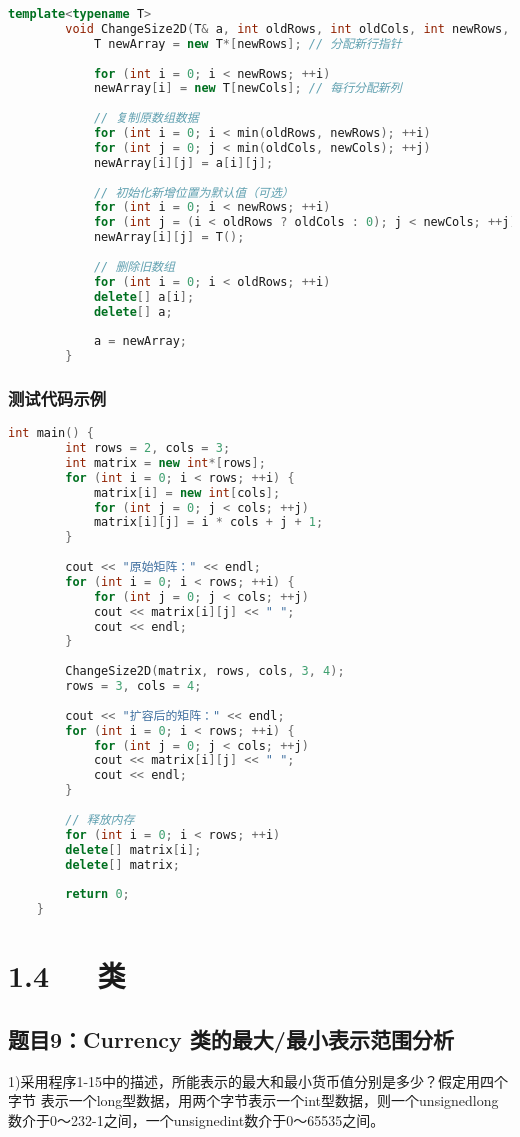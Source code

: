 \documentclass[UTF8]{ctexart}
\begin{document}
	\begin{lstlisting}[language=C++]
		template<typename T>
		void ChangeSize2D(T& a, int oldRows, int oldCols, int newRows, int newCols) {
			T newArray = new T*[newRows]; // 分配新行指针
			
			for (int i = 0; i < newRows; ++i)
			newArray[i] = new T[newCols]; // 每行分配新列
			
			// 复制原数组数据
			for (int i = 0; i < min(oldRows, newRows); ++i)
			for (int j = 0; j < min(oldCols, newCols); ++j)
			newArray[i][j] = a[i][j];
			
			// 初始化新增位置为默认值（可选）
			for (int i = 0; i < newRows; ++i)
			for (int j = (i < oldRows ? oldCols : 0); j < newCols; ++j)
			newArray[i][j] = T();
			
			// 删除旧数组
			for (int i = 0; i < oldRows; ++i)
			delete[] a[i];
			delete[] a;
			
			a = newArray;
		}
	\end{lstlisting}
	
	\subsubsection{测试代码示例}
	\begin{lstlisting}[language=C++]
	int main() {
		int rows = 2, cols = 3;
		int matrix = new int*[rows];
		for (int i = 0; i < rows; ++i) {
			matrix[i] = new int[cols];
			for (int j = 0; j < cols; ++j)
			matrix[i][j] = i * cols + j + 1;
		}
		
		cout << "原始矩阵：" << endl;
		for (int i = 0; i < rows; ++i) {
			for (int j = 0; j < cols; ++j)
			cout << matrix[i][j] << " ";
			cout << endl;
		}
		
		ChangeSize2D(matrix, rows, cols, 3, 4);
		rows = 3, cols = 4;
		
		cout << "扩容后的矩阵：" << endl;
		for (int i = 0; i < rows; ++i) {
			for (int j = 0; j < cols; ++j)
			cout << matrix[i][j] << " ";
			cout << endl;
		}
		
		// 释放内存
		for (int i = 0; i < rows; ++i)
		delete[] matrix[i];
		delete[] matrix;
		
		return 0;
	}
\end{lstlisting}
	\section{1.4~~~类}
	\subsection{题目9：Currency 类的最大/最小表示范围分析}
	1)采用程序1-15中的描述，所能表示的最大和最小货币值分别是多少？假定用四个字节
	表示一个long型数据，用两个字节表示一个int型数据，则一个unsignedlong数介于0～232-1之间，一个unsignedint数介于0～65535之间。
	
\end{document}
